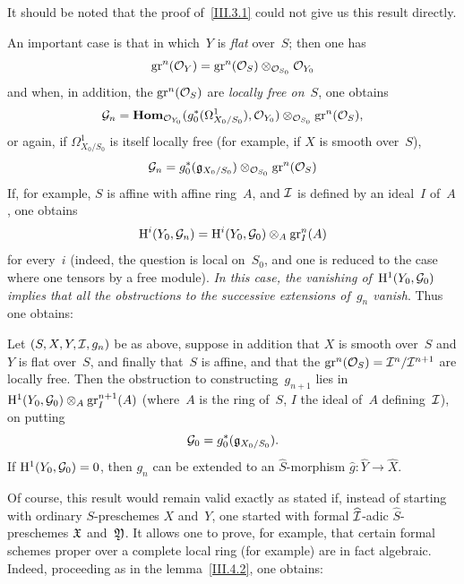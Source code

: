 It should be noted that the proof of~\ref{III.3.1} could not give us this
result directly.

An important case is that in which~$Y$ is \emph{flat} over~$S$; then one
has
\begin{equation*}
\gr^n(\cal{O}_Y)=\gr^n(\cal{O}_S)\otimes_{\cal{O}_{S_0}}\cal{O}_{Y_0}
\end{equation*}
and when, in addition, the $\gr^n(\cal{O}_S)$ are \emph{locally free on}~$S$,
one obtains
\begin{equation*}
\cal{G}_n=
\SheafHom_{\cal{O}_{Y_0}}(g_0^*(\Omega^1_{X_0/S_0}),\cal{O}_{Y_0})
\otimes_{\cal{O}_{S_0}}\gr^n(\cal{O}_S),
\end{equation*}
or again, if $\Omega^1_{X_0/S_0}$ is itself locally free (for example,
if $X$ is smooth over~$S$),
\begin{equation*}
\cal{G}_n=g_0^*(\goth{g}_{X_0/S_0})
\otimes_{\cal{O}_{S_0}}\gr^{n}(\cal{O}_S)
\end{equation*}
If, for example, $S$ is affine with affine ring~$A$, and $\cal{I}$ is
defined by an ideal~$I$ of~$A$, one obtains
\begin{equation*}
\H^i(Y_0,\cal{G}_n)=\H^i(Y_0,\cal{G}_0)\otimes_A\gr_I^n(A)
\end{equation*}
for every~$i$ (indeed, the question is local on~$S_0$, and one is reduced
to the case where one tensors by a free module). \emph{In this case, the
vanishing of~$\H^1(Y_0,\cal{G}_0)$ implies that all the obstructions to
the successive extensions of~$g_n$ vanish}. Thus one obtains:

\begin{corollary}
\label{III.5.6}
Let $(S,X,Y,\cal{I},g_n)$ be as above, suppose in addition that $X$ is
smooth over~$S$ and $Y$ is flat over~$S$, and finally that~$S$ is affine,
and that the $\gr^n(\cal{O}_S)=\cal{I}^n/\cal{I}^{n+1}$ are locally free.
Then the obstruction to constructing~$g_{n+1}$ lies in
$\H^1(Y_0,\cal{G}_0)\otimes_A\gr_I^{n+1}(A)$ (where~$A$ is the ring of~$S$,
$ I$ the ideal of~$A$ defining~$\cal{I}$), on putting
\begin{equation*}
\cal{G}_0=g_0^*(\goth{g}_{X_0/S_0}).
\end{equation*}
If $\H^1(Y_0,\cal{G}_0)=0$, then $g_n$ can be extended to an
$\widehat{S}$-morphism $\widehat{g}\colon\widehat{Y}\to\widehat{X}$.
\end{corollary}

Of course, this result would remain valid exactly as stated if, instead of
starting with ordinary $S$-preschemes $X$ and~$Y$, one started with formal
$\widehat{\cal{I}}$-adic $\widehat{S}$-preschemes $\goth{X}$ and~$\goth{Y}$.
It allows one to prove, for example, that certain formal schemes proper
over a complete local ring (for example) are in fact algebraic. Indeed, proceeding as
in the lemma~\ref{III.4.2}, one obtains:

